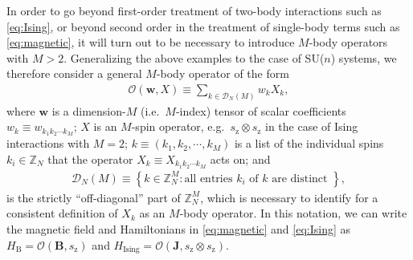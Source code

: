 \documentclass[nofootinbib,notitlepage,11pt]{revtex4-2}
\renewcommand{\t}{\text} %
\newcommand{\p}[1]{\left(#1\right)} %
\renewcommand{\set}[1]{\left\{#1\right\}} %
\newcommand{\m}{\bm} %
\newcommand{\1}{\mathds{1}}
\newcommand{\z}{\text{z}}
\newcommand{\D}{\mathcal{D}}
\renewcommand{\O}{\mathcal{O}}
\newcommand{\ZZ}{\mathbb{Z}}
\begin{document}
In order to go beyond first-order treatment of two-body interactions
such as \eqref{eq:Ising}, or beyond second order in the treatment of
single-body terms such as \eqref{eq:magnetic}, it will turn out to be
necessary to introduce $M$-body operators with $M>2$.  Generalizing
the above examples to the case of SU($n$) systems, we therefore
consider a general $M$-body operator of the form
\begin{align}
  \O\p{\m w,X} \equiv \sum_{k\in\D_N\p{M}} w_k X_k,
  \label{eq:multi_body_op}
\end{align}
where $\m w$ is a dimension-$M$ (i.e.~$M$-index) tensor of scalar
coefficients $w_k\equiv w_{k_1k_2\cdots k_M}$; $X$ is an $M$-spin
operator, e.g.~$s_\z\otimes s_\z$ in the case of Ising interactions
with $M=2$; $k\equiv\p{k_1,k_2,\cdots,k_M}$ is a list of the
individual spins $k_i\in\ZZ_N$ that the operator
$X_k\equiv X_{k_1k_2\cdots k_M}$ acts on; and
\begin{align}
  \D_N\p{M} \equiv
  \set{ k \in \ZZ_N^M : \t{all entries $k_i$ of $k$ are distinct } },
  \label{eq:off_diags}
\end{align}
is the strictly ``off-diagonal'' part of $\ZZ_N^M$, which is necessary
to identify for a consistent definition of $X_k$ as an $M$-body
operator.  In this notation, we can write the magnetic field and
Hamiltonians in \eqref{eq:magnetic} and \eqref{eq:Ising} as
$H_{\t{B}}=\O\p{\m B,s_\z}$ and
$H_{\t{Ising}}=\O\p{\m J,s_\z\otimes s_\z}$.
\end{document}
